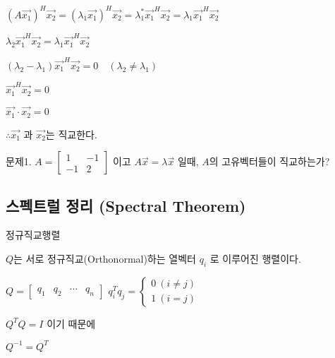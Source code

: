 $(A\vec{x_1})^H\vec{x_2}=(\lambda_1\vec{x_1})^H\vec{x_2}=\lambda_1^{\ast}\vec{x_1}^H\vec{x_2}=\lambda_1\vec{x_1}^H\vec{x_2}$

$\lambda_2\vec{x_1}^H\vec{x_2} = \lambda_1\vec{x_1}^H\vec{x_2}$

$(\lambda_2- \lambda_1)\vec{x_1}^H\vec{x_2}=0 \quad (\lambda_2 \ne \lambda_1)$

$\vec{x_1}^H\vec{x_2}=0$

$\vec{x_1} \cdot \vec{x_2} = 0$

$\therefore \vec{x_1}$ 과 $\vec{x_2}$는 직교한다.


\newpage
문제1. $A=\begin{bmatrix}1 & -1 \\ -1 & 2\end{bmatrix}$ 이고 $A\vec{x}=\lambda\vec{x}$ 일때, $A$의 고유벡터들이 직교하는가?
\newpage
\subsection{스펙트럴 정리 (Spectral Theorem)}

\begin{definition} 
정규직교행렬

$Q$는 서로 정규직교(Orthonormal)하는 열벡터 $q_i$ 로 이루어진 행렬이다.

$Q=\begin{bmatrix} q_1 & q_2 & \cdots & q_n \end{bmatrix}$  $q_i^Tq_j = \begin{cases} 0 \ (i \ne j) \\ 1 \ (i =j) \end{cases}$

$Q^TQ=I$ 이기 때문에

$Q^{-1}=Q^T$

\end{definition}

